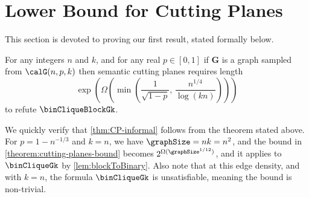 \section{Lower Bound for Cutting Planes} \label{sec:binCliqueDagCP}

\newcommand{\protocol}{\Pi}
\newcommand{\bw}{\mathsf{bw}}


This section is devoted to proving our first result, stated formally below.
\begin{theorem}
    For any  
    integers $n$ and $k$, and for any real $p \in [0,1]$
    if $\bm G$ is a graph sampled from $\calG(n,p,k)$ then \aas semantic cutting planes requires length 
    \begin{equation*}
        \exp\left({\Omega\left({\min\left(
    \frac{1}{\sqrt{1-p}},
    \,
    \frac{n^{1/4}}{\log(kn)}\right)}\right)}\right)
    \end{equation*}
    to refute $\binCliqueBlockGk$.%
    \label{theorem:cutting-planes-bound}
\end{theorem}
We quickly verify that \autoref{thm:CP-informal} follows from the theorem stated above. For $p=1-n^{-1/3}$ and $k = n$, we have $\graphSize=nk=n^2$, and the bound in \autoref{theorem:cutting-planes-bound} becomes $2^{\Omega(\graphSize^{1/12})}$, 
   and it applies to $\binCliqueGk$ by \autoref{lem:blockToBinary}. Also note that at this edge density, and with $k=n$, the formula $\binCliqueGk$ is \aas unsatisfiable, meaning the bound is non-trivial. 



